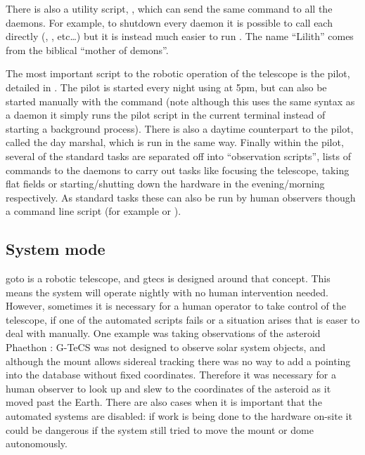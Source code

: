 \begin{colsection}
\begin{colsection}
There is also a utility script, , which can send the same command to all the daemons. For example, to shutdown every daemon it is possible to call each directly (, ,  etc\ldots) but it is instead much easier to run . The name ``Lilith'' comes from the biblical ``mother of demons''.

The most important script to the robotic operation of the telescope is the pilot, detailed in . The pilot is started every night using  at 5pm, but can also be started manually with the command  (note although this uses the same syntax as a daemon it simply runs the pilot script in the current terminal instead of starting a background process). There is also a daytime counterpart to the pilot, called the day marshal, which is run in the same way. Finally within the pilot, several of the standard tasks are separated off into ``observation scripts'', lists of commands to the daemons to carry out tasks like focusing the telescope, taking flat fields or starting/shutting down the hardware in the evening/morning respectively. As standard tasks these can also be run by human observers though a command line script  (for example  or ).

\end{colsection}


\subsection{System mode}
\label{sec:mode}
\begin{colsection}

\gls{goto} is a robotic telescope, and \gls{gtecs} is designed around that concept. This means the system will operate nightly with no human intervention needed. However, sometimes it is necessary for a human operator to take control of the telescope, if one of the automated scripts fails or a situation arises that is easer to deal with manually. One example was taking observations of the asteroid Phaethon \citep{Phaethon}: G-TeCS was not designed to observe solar system objects, and although the mount allows sidereal tracking there was no way to add a pointing into the database without fixed coordinates. Therefore it was necessary for a human observer to look up and slew to the coordinates of the asteroid as it moved past the Earth. There are also cases when it is important that the automated systems are disabled: if work is being done to the hardware on-site it could be dangerous if the system still tried to move the mount or dome autonomously.



\end{colsection}
\end{colsection}
